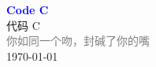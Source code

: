 \vspace*{\fill}
\begin{center}
    \textcolor{blue}{\Huge\textbf{Code C}} \\[1em]
    \textcolor{blue!60!black}{\Large 代码 C} \\[2em]
    \textcolor{gray}{\large 你如同一个吻，封碱了你的嘴} \\[1em]
    \today
\end{center}
\vspace*{\fill}
\clearpage


\clearpage

\clearpage

\clearpage


